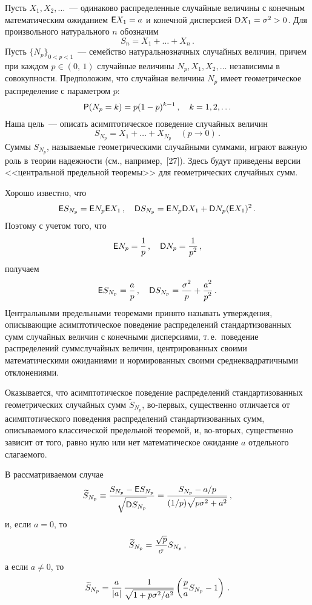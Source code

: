 \begin{multicols}{2}
Пусть $X_1,X_2,\ldots$~--- одинаково распределенные случайные
величины с конечным математическим ожиданием ${\sf E}X_1=a$ и
конечной дисперсией ${\sf D}X_1=\sigma^2>0$. Для произвольного
натурального $n$ обозначим
$$
S_n=X_1+\ldots+X_n\,.
$$
Пусть $\{N_p\}_{0<p<1}$~--- семейство натуральнозначных случайных
величин, причем при каждом $p\in(0,\,1)$ случайные величины
$N_p,X_1,X_2,\ldots$ независимы в совокупности. Предположим, что
случайная величина $N_p$ имеет геометрическое распределение с
параметром $p$:
\begin{equation}
{\sf P}(N_p=k)=p(1-p)^{k-1}\,,\quad k=1,2,\ldots\label{4.1b}
\end{equation}
Наша цель~--- описать асимптотическое
поведение случайных величин
$$
S_{N_p}=X_1+\ldots+X_{N_p}\quad (p\to 0)\,.
$$
Суммы $S_{N_p}$, называемые геометрическими случайными
суммами, играют важную роль в теории надежности (см., например,~[27]). 
Здесь будут приведены версии
<<центральной предельной теоремы>> для геометрических случайных сумм.

Хорошо известно, что
$$
{\sf E}S_{N_p}={\sf E}N_p{\sf E}X_1\,,\quad
{\sf D}S_{N_p}={\sf E}N_p{\sf D}X_1+{\sf D}N_p({\sf E}X_1)^2\,.
$$
Поэтому с учетом того, что
$$
{\sf E}N_p=\displaystyle\frac{\displaystyle 1\mathstrut}{\displaystyle p\mathstrut}\,,\quad
{\sf D}N_p=\displaystyle\frac{\displaystyle 1\mathstrut}{\displaystyle p^2\mathstrut}\,,
$$
получаем
$$
{\sf E}S_{N_p}=\displaystyle\frac{\displaystyle a\mathstrut}{\displaystyle p\mathstrut}\,,\quad
{\sf D}S_{N_p}=\displaystyle\frac{\displaystyle \sigma^2\mathstrut}{\displaystyle p\mathstrut}+\displaystyle\frac{\displaystyle a^2\mathstrut}{\displaystyle p^2\mathstrut}\,.
$$
Центральными предельными теоремами принято называть утверждения,
описывающие асимптотическое поведение распределений
стандартизованных сумм случайных величин с конечными дис\-пер\-сиями,
т.\,е.\ поведение распределений сумм\linebreak случайных величин,
центрированных своими математическими ожиданиями и нормированных
своими среднеквадратичными отклонениями.

Оказывается, что асимптотическое поведение распределений
стандартизованных геометрических случайных сумм $\widetilde
S_{N_p}$, во-первых, существенно отличается от асимптотического
поведения распределений стандартизованных сумм, описываемого
классической предельной теоремой, и, во-вторых, существенно зависит
от того, равно нулю или нет математическое ожидание $a$ отдельного
слагаемого.

В рассматриваемом случае
$$
\widetilde S_{N_p}\equiv\displaystyle\frac{\displaystyle S_{N_p}-{\sf E}S_{N_p}\mathstrut}{\displaystyle \sqrt{{\sf
D}S_{N_p}}\mathstrut}=\displaystyle\frac{\displaystyle S_{N_p}-a/p\mathstrut}{\displaystyle (1/p)\sqrt{p\sigma^2+a^2}\mathstrut}\,,
$$
и, если $a=0$, то
$$
\widetilde S_{N_p}=\displaystyle\frac{\displaystyle \sqrt{p}\mathstrut}{\displaystyle \sigma\mathstrut}S_{N_p}\,,
$$
а если $a\neq0$, то
\begin{equation}
\widetilde S_{N_p}=
\displaystyle\frac{\displaystyle a\mathstrut}{\displaystyle |a|\mathstrut}\,\displaystyle\frac{\displaystyle 1\mathstrut}{\displaystyle \sqrt{1+p\sigma^2/a^2}\mathstrut}\left(
\displaystyle\frac{\displaystyle p\mathstrut}{\displaystyle a\mathstrut}S_{N_p}-1\right)\,.
\label{4.2b}
\end{equation}


\end{multicols}
